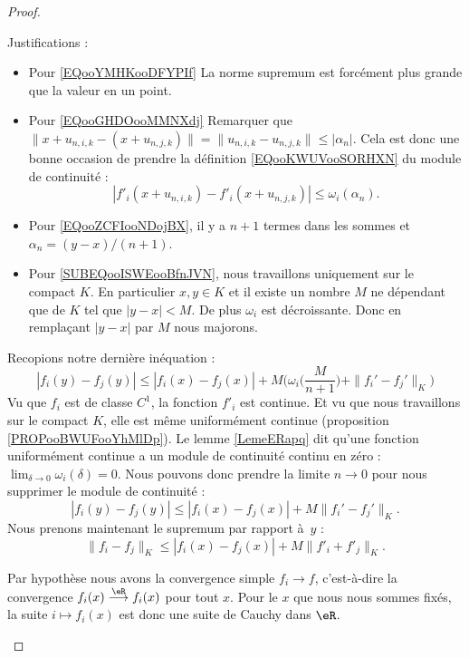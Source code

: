 \begin{proof}
\begin{subproof}
\begin{subequations}
  \end{subequations}
  Justifications :
  \begin{itemize}
      \item Pour \eqref{EQooYMHKooDFYPIf}
          La norme supremum est forcément plus grande que la valeur en un point.
      \item Pour \eqref{EQooGHDOooMMNXdj}
  Remarquer que \( \| x+u_{n,i,k}-(x+u_{n,j,k}) \|=\| u_{n,i,k}-u_{n,j,k} \|\leq |\alpha_n|\). Cela est donc une bonne occasion de prendre la définition \eqref{EQooKWUVooSORHXN} du module de continuité :
  \begin{equation}
     \left| f'_i(x+ u_{n,i,k}) - f'_i(x+u_{n,j,k}) \right|\leq \omega_i(\alpha_n) .
  \end{equation}
    \item  Pour \eqref{EQooZCFIooNDojBX}, il y a \( n+1\) termes dans les sommes et \( \alpha_n=(y-x)/(n+1)\).
    \item Pour \eqref{SUBEQooISWEooBfnJVN}, nous travaillons uniquement sur le compact \( K\). En particulier \( x,y\in K\) et il existe un nombre \( M\) ne dépendant que de \( K\) tel que \( | y-x |<M\). De plus \( \omega_i\) est décroissante. Donc en remplaçant \( | y-x |\) par \( M\) nous majorons.
  \end{itemize}

    Recopions notre dernière inéquation :
    \begin{equation}
        | f_i(y) - f_j(y)| \leq | f_i(x)-f_j(x) |+M\Big( \omega_i\big( \frac{ M }{ n+1 } \big)+\| f_i'-f_j' \|_K \Big)
    \end{equation}
    Vu que \( f_i\) est de classe \( C^1\), la fonction \( f'_i\) est continue. Et vu que nous travaillons sur le compact \( K\), elle est même uniformément continue (proposition \ref{PROPooBWUFooYhMlDp}). Le lemme \ref{LemeERapq} dit qu'une fonction uniformément continue a un module de continuité continu en zéro : $\lim_{\delta\to 0} \omega_i(\delta) = 0$. Nous pouvons donc prendre la limite \( n\to 0\) pour nous supprimer le module de continuité :
    \begin{equation}
        | f_i(y)-f_j(y) |\leq | f_i(x)-f_j(x) |+M\| f_i'-f_j' \|_K.
    \end{equation}
  Nous prenons maintenant le supremum par rapport à~$y$ :
  \begin{equation}
    \|f_i-f_j\|_K \leq  \left| f_i(x) - f_j(x) \right| + M \|f'_i+f'_j\|_K.
  \end{equation}
  
  Par hypothèse nous avons la convergence simple \( f_i\to f\), c'est-à-dire la convergence \( f_i(x)\stackrel{\eR}{\longrightarrow}f_i(x)\) pour tout \( x\). Pour le \( x\) que nous nous sommes fixés, la suite \( i\mapsto f_i(x)\) est donc une suite de Cauchy dans \( \eR\).


\end{subproof}
\end{proof}

